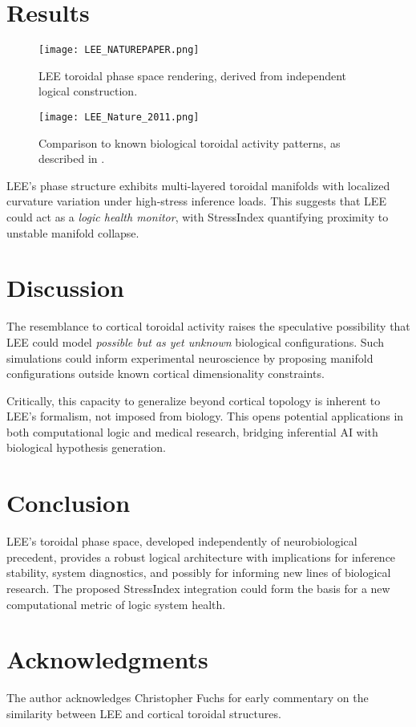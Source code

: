 \documentclass[12pt]{article}
\begin{document}
\section{Results}
\begin{figure}[h]
    \centering
    \texttt{[image: LEE\_NATUREPAPER.png]}
    \caption{LEE toroidal phase space rendering, derived from independent logical construction.}
\end{figure}

\begin{figure}[h]
    \centering
    \texttt{[image: LEE\_Nature\_2011.png]}
    \caption{Comparison to known biological toroidal activity patterns, as described in \citep{cortical2011}.}
\end{figure}

LEE’s phase structure exhibits multi-layered toroidal manifolds with localized curvature variation under high-stress inference loads. This suggests that LEE could act as a \emph{logic health monitor}, with StressIndex quantifying proximity to unstable manifold collapse.

\section{Discussion}
The resemblance to cortical toroidal activity raises the speculative possibility that LEE could model \emph{possible but as yet unknown} biological configurations. Such simulations could inform experimental neuroscience by proposing manifold configurations outside known cortical dimensionality constraints.

Critically, this capacity to generalize beyond cortical topology is inherent to LEE's formalism, not imposed from biology. This opens potential applications in both computational logic and medical research, bridging inferential AI with biological hypothesis generation.

\section{Conclusion}
LEE's toroidal phase space, developed independently of neurobiological precedent, provides a robust logical architecture with implications for inference stability, system diagnostics, and possibly for informing new lines of biological research. The proposed StressIndex integration could form the basis for a new computational metric of logic system health.

\section*{Acknowledgments}
The author acknowledges Christopher Fuchs for early commentary on the similarity between LEE and cortical toroidal structures.



\end{document}
